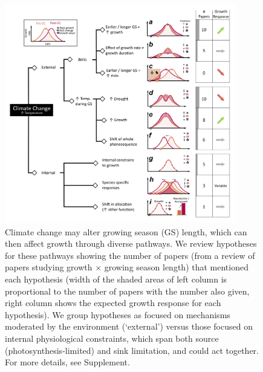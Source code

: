 \documentclass[11pt]{article}
\begin{document}
\begin{figure}[h!]
\includegraphics[width=0.9\textwidth]{..//figures/_figuresFromRuben/conceptual.png}
\caption{Climate change may alter growing season (GS) length, which can then affect growth through diverse pathways. We review hypotheses for these pathways showing the number of papers (from a review of papers studying growth $\times$ growing season length) that mentioned each hypothesis (width of the shaded areas of left column is proportional to the number of papers with the number also given, right column shows the expected growth response for each hypothesis). We group hypotheses as focused on mechanisms moderated by the environment (`external') versus those focused on internal physiological constraints, which span both source (photosynthesis-limited) and sink limitation, and could act together. For more details, see Supplement.} 
\label{fig:hypotheses}
\end{figure}
\end{document}
